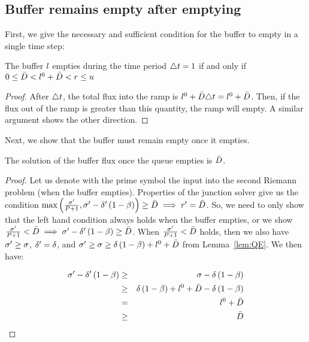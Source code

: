 \subsection{\label{sub:Buffer-remains-empty}Buffer remains empty after emptying}

First, we give the necessary and sufficient condition for the buffer
to empty in a single time step:
\begin{lem}
\label{lem:QE}The buffer $l$ empties during the time
period $\triangle t=1$ if and only if $0\le\bar{D}<l_{}^{0}+\bar{D}<r\le u$\end{lem}
\begin{proof}
After $\triangle t$, the total flux into the ramp is $l_{}^{0}+\bar{D}\triangle t=l_{}^{0}+\bar{D}$.
Then, if the flux out of the ramp is greater than this quantity, the
ramp will empty. A similar argument shows the other direction.
\end{proof}
Next, we show that the buffer must remain empty once it empties.
\begin{lem}
\label{lem:remain-empty}The solution of the buffer flux once the
queue empties is $\bar{D}$.\end{lem}
\begin{proof}
Let us denote with the prime symbol the input into the second Riemann
problem (when the buffer empties). Properties of the junction solver
give us the condition $\max\left(\frac{\sigma'}{P+1},\sigma'-\delta'\left(1-\beta\right)\right)\ge\bar{D}\implies r'=\bar{D}$.
So, we need to only show that the left hand condition always holds
when the buffer empties, or we show $\frac{\sigma'}{P+1}<\bar{D}\implies\sigma'-\delta'\left(1-\beta\right)\ge\bar{D}$.
When $\frac{\sigma'}{P+1}<\bar{D}$
holds, then we also have $\sigma'\ge\sigma$,
$\delta'=\delta$, and $\sigma'\ge\sigma\ge\delta\left(1-\beta\right)+l_{}^{0}+\bar{D}$
from Lemma~\ref{lem:QE}. We then have:

\begin{eqnarray*}
\sigma'-\delta'\left(1-\beta\right) & \ge & \sigma-\delta\left(1-\beta\right)\\
 & \ge & \delta\left(1-\beta\right)+l_{}^{0}+\bar{D}-\delta\left(1-\beta\right)\\
 & = & l_{}^{0}+\bar{D}\\
 & \ge & \bar{D}
\end{eqnarray*}

\end{proof}

